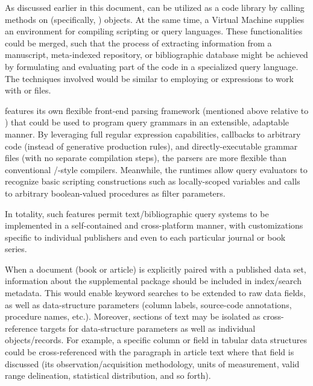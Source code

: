 \documentclass[11pt]{article}
\begin{document}
{{\begin{description}
\vspace*{-4pt}

\item[Full-Text Query Languages]  As discussed earlier in this 
document, \PacTk{} can be utilized as a code library by 
calling methods on \Cpp{} (specifically, \TSOM{}) objects.  
At the same time, a \PacTk{} Virtual Machine supplies an  
environment for compiling scripting or query languages.  
These functionalities could be merged, such that the process 
of extracting information from a \PDF{} manuscript, 
meta-indexed repository, or bibliographic database might be 
achieved by formulating and evaluating part of the code in a 
specialized query language.  The techniques involved 
would be similar to employing \XQuery{} or \XQSE{} 
expressions to work with \JATS{} or \BITS{} files.

\pseudoIndent{} \lPacTk{} features its own flexible front-end parsing 
framework (mentioned above relative to \GTagML{}) that 
could be used to program query grammars in an extensible, 
adaptable manner.  By leveraging full regular expression 
capabilities, callbacks to arbitrary code (instead of 
generative production rules), and directly-executable 
grammar files (with no separate compilation steps), 
the \PacTk{} parsers are more flexible than conventional 
\LEX{}/\YACC{}-style compilers.  Meanwhile, the \VM{} 
runtimes allow query evaluators to recognize basic 
scripting constructions such as locally-scoped variables 
and calls to arbitrary boolean-valued procedures as 
filter parameters.

\pseudoIndent{} In totality, such features permit 
text/bibliographic query systems to be implemented 
in a self-contained and cross-platform manner, 
with customizations specific to individual publishers 
and even to each particular journal or book series.  

\vspace*{-4pt}


\item[Multimedia Cross-Referencing]  When a document (book or article) is explicitly paired with a 
published data set, information about the supplemental package should be 
included in index/search metadata.  This would enable 
keyword searches to be extended to raw data fields, as well 
as data-structure parameters (column labels, source-code 
annotations, procedure names, etc.).  Moreover, sections of text 
may be isolated as cross-reference targets for data-structure parameters 
as well as individual objects/records.  For example, a specific 
column or field in tabular data structures could be cross-referenced 
with the paragraph in article text where that field is 
discussed (its observation/acquisition methodology, units of measurement, 
valid range delineation, statistical distribution, and so forth).


\end{description}}}
\end{document}
